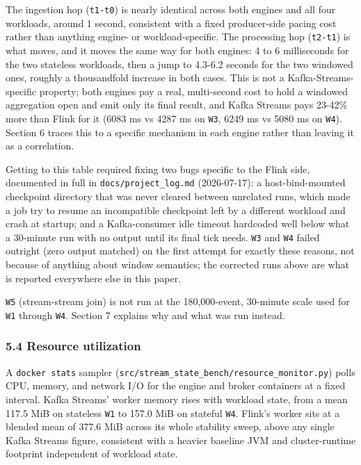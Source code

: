 \documentclass[
]{article}
\begin{document}
The ingestion hop (\texttt{t1-t0}) is nearly identical across both
engines and all four workloads, around 1 second, consistent with a fixed
producer-side pacing cost rather than anything engine- or
workload-specific. The processing hop (\texttt{t2-t1}) is what moves,
and it moves the same way for both engines: 4 to 6 milliseconds for the
two stateless workloads, then a jump to 4.3-6.2 seconds for the two
windowed ones, roughly a thousandfold increase in both cases. This is
not a Kafka-Streams-specific property; both engines pay a real,
multi-second cost to hold a windowed aggregation open and emit only its
final result, and Kafka Streams pays 23-42\% more than Flink for it
(6083 ms vs 4287 ms on \texttt{W3}, 6249 ms vs 5080 ms on \texttt{W4}).
Section 6 traces this to a specific mechanism in each engine rather than
leaving it as a correlation.

Getting to this table required fixing two bugs specific to the Flink
side, documented in full in \texttt{docs/project\_log.md} (2026-07-17):
a host-bind-mounted checkpoint directory that was never cleared between
unrelated runs, which made a job try to resume an incompatible
checkpoint left by a different workload and crash at startup; and a
Kafka-consumer idle timeout hardcoded well below what a 30-minute run
with no output until its final tick needs. \texttt{W3} and \texttt{W4}
failed outright (zero output matched) on the first attempt for exactly
these reasons, not because of anything about window semantics; the
corrected runs above are what is reported everywhere else in this paper.

\texttt{W5} (stream-stream join) is not run at the 180,000-event,
30-minute scale used for \texttt{W1} through \texttt{W4}. Section 7
explains why and what was run instead.

\hypertarget{resource-utilization}{%
\subsubsection{5.4 Resource utilization}\label{resource-utilization}}

A \texttt{docker\ stats} sampler
(\texttt{src/stream\_state\_bench/resource\_monitor.py}) polls CPU,
memory, and network I/O for the engine and broker containers at a fixed
interval. Kafka Streams' worker memory rises with workload state, from a
mean 117.5 MiB on stateless \texttt{W1} to 157.0 MiB on stateful
\texttt{W4}. Flink's worker sits at a blended mean of 377.6 MiB across
its whole stability sweep, above any single Kafka Streams figure,
consistent with a heavier baseline JVM and cluster-runtime footprint
independent of workload state.
\end{document}
